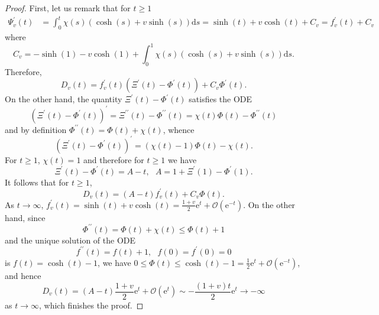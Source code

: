 \documentclass[10pt,a4paper]{amsart}
\begin{document}
\begin{proof}
    First, let us remark that for $t \geq 1$
    \begin{align*}
        \Psi^\prime_v(t) & = \int_0^t \chi(s) (\cosh(s) + v \sinh(s)) \mathrm{d}s = \sinh(t) + v \cosh(t) + C_v = f^\prime_v(t) + C_v
    \end{align*}
    where 
    \begin{equation*}
        C_v = - \sinh(1) - v \cosh(1) + \int_0^1 \chi(s) (\cosh(s) + v \sinh(s)) \mathrm{d}s .
    \end{equation*}
    Therefore,
    \begin{equation*}
        D_v(t) = f^\prime_v(t) (\Xi^\prime(t)-\Phi^\prime(t)) + C_v \Phi^\prime(t) .
    \end{equation*}
    On the other hand, the quantity $\Xi^\prime(t) - \Phi^\prime(t)$ satisfies the ODE
    \begin{equation*}
        (\Xi^\prime(t)-\Phi^\prime(t))^\prime = \Xi^{\prime\prime}(t) - \Phi^{\prime\prime}(t) = \chi(t) \Phi(t) - \Phi^{\prime\prime}(t)
    \end{equation*}
    and by definition $\Phi^{\prime\prime}(t) = \Phi(t) + \chi(t)$, whence
    \begin{equation*}
        (\Xi^\prime(t)-\Phi^\prime(t))^\prime = (\chi(t)-1)\Phi(t) - \chi(t) .
    \end{equation*}
    For $t \geq 1$, $\chi(t) = 1$ and therefore for $t \geq 1$ we have
    \begin{equation*}
        \Xi^\prime(t)-\Phi^\prime(t) = A - t , ~~~ A = 1 + \Xi^\prime(1) - \Phi^\prime(1) .
    \end{equation*}
    It follows that for $t \geq 1$, 
    \begin{equation*}
        D_v(t) = (A- t) f^\prime_v(t) + C_v \Phi(t) .
    \end{equation*}
    As $t \rightarrow \infty$, $f^\prime_v(t) = \sinh(t) + v \cosh(t) = \frac{1+v}{2} \mathrm{e}^t + \mathcal{O}(\mathrm{e}^{-t})$. On the other hand, since 
    \begin{equation*}
        \Phi^{\prime\prime}(t) = \Phi(t) + \chi(t) \leq \Phi(t) + 1
    \end{equation*}
    and the unique solution of the ODE
    \begin{equation*}
        f^{\prime\prime}(t) = f(t) + 1, ~~~ f(0) = f^\prime(0) = 0
    \end{equation*}
    is $f(t) =\cosh(t)-1$, we have $0 \leq \Phi(t) \leq \cosh(t)-1 = \frac{1}{2}\mathrm{e}^t + \mathcal{O}(\mathrm{e}^{-t})$, and hence
    \begin{equation*}
        D_v(t) = (A-t) \frac{1+v}{2} \mathrm{e}^t + \mathcal{O}(\mathrm{e}^t) \sim -\frac{(1+v)t}{2} \mathrm{e}^t \rightarrow - \infty
    \end{equation*}
    as $t \rightarrow \infty$, which finishes the proof.
\end{proof}
\end{document}
